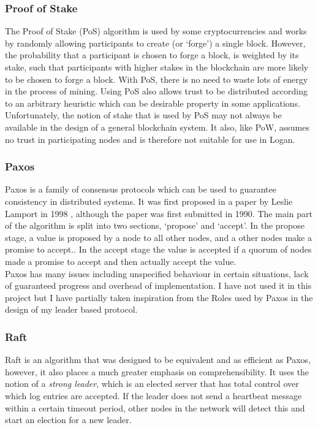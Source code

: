 \documentclass[12pt,a4paper,twoside,openright]{report}
\begin{document}
	\subsubsection*{Proof of Stake}
	The Proof of Stake (PoS) algorithm \parencite{ProofofStake} is used by some cryptocurrencies and works by randomly allowing participants to create (or `forge') a single block.
	However, the probability that a participant is chosen to forge a block, is weighted by its stake, such that participants with higher stakes in the blockchain are more likely to be chosen to forge a block.
	With PoS, there is no need to waste lots of energy in the process of mining. 
	Using PoS also allows trust to be distributed according to an arbitrary heuristic which can be desirable property in some applications.\\

	Unfortunately, the notion of stake that is used by PoS may not always be available in the design of a general blockchain system. 
	It also, like PoW, assumes no trust in participating nodes and is therefore not suitable for use in Logan.

	\subsubsection*{Paxos}
	Paxos is a family of consensus protocols which can be used to guarantee consistency in distributed systems. 
	It was first proposed in a paper by Leslie Lamport in 1998 \parencite{Paxos}, although the paper was first submitted in 1990.
	The main part of the algorithm is split into two sections, `propose' and `accept'.
	In the propose stage, a value is proposed by a node to all other nodes, and a other nodes make a promise to accept.. 
	In the accept stage the value is accepted if a quorum of nodes made a promise to accept and then actually accept the value.\\

	Paxos has many issues including unspecified behaviour in certain situations, lack of guaranteed progress and overhead of implementation.
	I have not used it in this project but I have partially taken inspiration from the Roles used by Paxos in the design of my leader based protocol.

	\subsubsection*{Raft}
	Raft \parencite{Raft} is an algorithm that was designed to be equivalent and as efficient as Paxos, however, it also places a much greater emphasis on comprehensibility.
	It uses the notion of a \textit{strong leader}, which is an elected server that has total control over which log entries are accepted.
	If the leader does not send a heartbeat message within a certain timeout period, other nodes in the network will detect this and start an election for a new leader.\\
	
\end{document}

